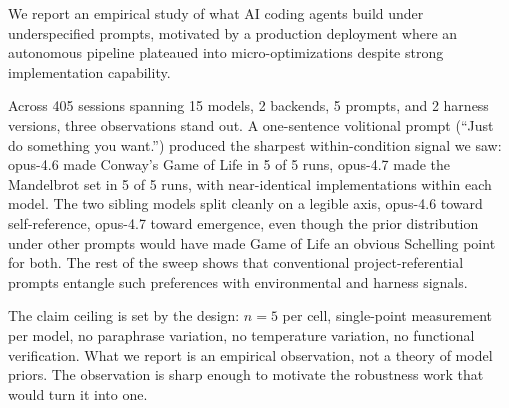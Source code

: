 \documentclass{article}
\begin{document}
We report an empirical study of what AI coding agents build
under underspecified prompts, motivated by a production
deployment where an autonomous pipeline plateaued into
micro-optimizations despite strong implementation capability.

Across 405 sessions spanning 15 models, 2 backends, 5 prompts,
and 2 harness versions, three observations stand out. A
one-sentence volitional prompt (``Just do something you
want.'') produced the sharpest within-condition signal we
saw: opus-4.6 made Conway's Game of Life in 5 of 5 runs,
opus-4.7 made the Mandelbrot set in 5 of 5 runs, with
near-identical implementations within each model. The two
sibling models split cleanly on a legible axis, opus-4.6
toward self-reference, opus-4.7 toward emergence, even
though the prior distribution under other prompts would have
made Game of Life an obvious Schelling point for both. The
rest of the sweep shows that conventional project-referential
prompts entangle such preferences with environmental and
harness signals.

The claim ceiling is set by the design: $n=5$ per cell,
single-point measurement per model, no paraphrase variation,
no temperature variation, no functional verification. What we
report is an empirical observation, not a theory of model
priors. The observation is sharp enough to motivate the
robustness work that would turn it into one.
\end{document}
